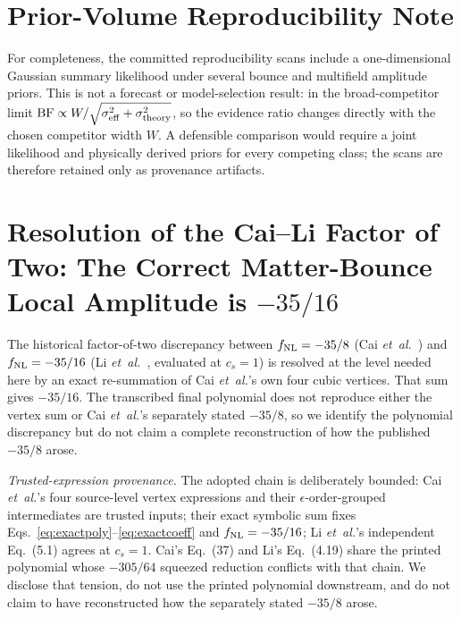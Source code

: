 \documentclass[aps,prd,twocolumn,superscriptaddress,showpacs,preprintnumbers,nofootinbib,longbibliography,floatfix]{revtex4-2}
\newcommand{\fnl}{f_{\rm NL}}
\newcommand{\etal}{\textit{et~al.}}
\begin{document}
\appendix

\section{Prior-Volume Reproducibility Note}
\label{app:priorvolume}

For completeness, the committed reproducibility scans include a one-dimensional Gaussian summary likelihood under several bounce and multifield amplitude priors. This is not a forecast or model-selection result: in the broad-competitor limit $\mathrm{BF}\propto W/\sqrt{\sigma_{\rm eff}^2+\sigma_{\rm theory}^2}$, so the evidence ratio changes directly with the chosen competitor width $W$. A defensible comparison would require a joint likelihood and physically derived priors for every competing class; the scans are therefore retained only as provenance artifacts.

\section{Resolution of the Cai--Li Factor of Two: The Correct Matter-Bounce Local Amplitude is $-35/16$}
\label{app:convention}

The historical factor-of-two discrepancy between $\fnl = -35/8$ (Cai \textit{et~al.}~\cite{Cai:2009fn}) and $\fnl = -35/16$ (Li \etal~\cite{LiQuintin:2017}, evaluated at $c_s=1$) is resolved at the level needed here by an exact re-summation of Cai \etal's own four cubic vertices. That sum gives $-35/16$. The transcribed final polynomial does not reproduce either the vertex sum or Cai \etal's separately stated $-35/8$, so we identify the polynomial discrepancy but do not claim a complete reconstruction of how the published $-35/8$ arose.

\emph{Trusted-expression provenance.} The adopted chain is deliberately bounded: Cai \etal's four source-level vertex expressions and their $\epsilon$-order-grouped intermediates are trusted inputs; their exact symbolic sum fixes Eqs.~\eqref{eq:exactpoly}--\eqref{eq:exactcoeff} and $\fnl=-35/16$; Li \etal's independent Eq.~(5.1) agrees at $c_s=1$. Cai's Eq.~(37) and Li's Eq.~(4.19) share the printed polynomial whose $-305/64$ squeezed reduction conflicts with that chain. We disclose that tension, do not use the printed polynomial downstream, and do not claim to have reconstructed how the separately stated $-35/8$ arose.
\end{document}
